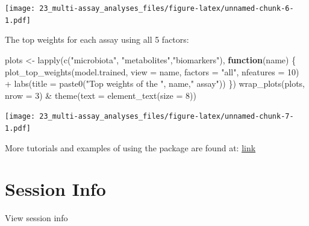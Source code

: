 \documentclass[
]{book}
\newenvironment{Shaded}{\begin{snugshade}}{\end{snugshade}}
\newcommand{\AttributeTok}[1]{\textcolor[rgb]{0.77,0.63,0.00}{#1}}
\newcommand{\ControlFlowTok}[1]{\textcolor[rgb]{0.13,0.29,0.53}{\textbf{#1}}}
\newcommand{\DecValTok}[1]{\textcolor[rgb]{0.00,0.00,0.81}{#1}}
\newcommand{\FunctionTok}[1]{\textcolor[rgb]{0.00,0.00,0.00}{#1}}
\newcommand{\NormalTok}[1]{#1}
\newcommand{\OtherTok}[1]{\textcolor[rgb]{0.56,0.35,0.01}{#1}}
\newcommand{\SpecialCharTok}[1]{\textcolor[rgb]{0.00,0.00,0.00}{#1}}
\newcommand{\StringTok}[1]{\textcolor[rgb]{0.31,0.60,0.02}{#1}}
\begin{document}
\texttt{[image: 23\_multi-assay\_analyses\_files/figure-latex/unnamed-chunk-6-1.pdf]}

The top weights for each assay using all 5 factors:

\begin{Shaded}
\begin{Highlighting}[]
\NormalTok{plots }\OtherTok{\textless{}{-}} \FunctionTok{lapply}\NormalTok{(}\FunctionTok{c}\NormalTok{(}\StringTok{"microbiota"}\NormalTok{, }\StringTok{"metabolites"}\NormalTok{,}\StringTok{"biomarkers"}\NormalTok{), }\ControlFlowTok{function}\NormalTok{(name) \{}
    \FunctionTok{plot\_top\_weights}\NormalTok{(model.trained,}
                     \AttributeTok{view =}\NormalTok{ name,}
                     \AttributeTok{factors =} \StringTok{"all"}\NormalTok{,}
                     \AttributeTok{nfeatures =} \DecValTok{10}\NormalTok{) }\SpecialCharTok{+}
        \FunctionTok{labs}\NormalTok{(}\AttributeTok{title =} \FunctionTok{paste0}\NormalTok{(}\StringTok{"Top weights of the "}\NormalTok{, name,}\StringTok{" assay"}\NormalTok{))}
\NormalTok{\})}
\FunctionTok{wrap\_plots}\NormalTok{(plots, }\AttributeTok{nrow =} \DecValTok{3}\NormalTok{) }\SpecialCharTok{\&} \FunctionTok{theme}\NormalTok{(}\AttributeTok{text =} \FunctionTok{element\_text}\NormalTok{(}\AttributeTok{size =} \DecValTok{8}\NormalTok{))}
\end{Highlighting}
\end{Shaded}

\texttt{[image: 23\_multi-assay\_analyses\_files/figure-latex/unnamed-chunk-7-1.pdf]}

More tutorials and examples of using the package are found at: \href{https://biofam.github.io/MOFA2/tutorials.html}{link}

\hypertarget{session-info-9}{%
\section*{Session Info}\label{session-info-9}}

View session info
\end{document}
